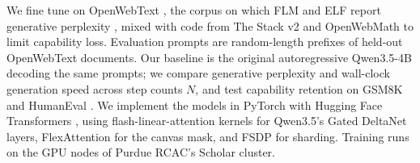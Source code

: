 \documentclass[11pt]{article}
\begin{document}
We fine tune on OpenWebText \citep{gokaslan2019openwebtext}, the corpus on which FLM and ELF report generative perplexity \citep{lee2026flm,hu2026elf}, mixed with code from The Stack v2 \citep{lozhkov2024starcoder2} and OpenWebMath \citep{paster2024openwebmath} to limit capability loss. Evaluation prompts are random-length prefixes of held-out OpenWebText documents. Our baseline is the original autoregressive Qwen3.5-4B decoding the same prompts; we compare generative perplexity and wall-clock generation speed across step counts $N$, and test capability retention on GSM8K \citep{cobbe2021gsm8k} and HumanEval \citep{chen2021humaneval}. We implement the models in PyTorch \citep{paszke2019pytorch} with Hugging Face Transformers \citep{wolf2020transformers}, using flash-linear-attention kernels for Qwen3.5's Gated DeltaNet layers, FlexAttention for the canvas mask, and FSDP for sharding. Training runs on the GPU nodes of Purdue RCAC's Scholar cluster.


\end{document}
